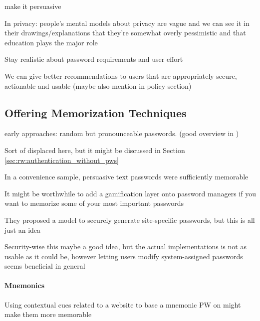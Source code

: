 	
	make it persuasive \cite{Zakaria2013DesigningEffectiveSecurityMessages}
	
	In privacy: people's mental models about privacy are vague and we can see it in their drawings/explanations that they're somewhat overly pessimistic and that education plays the major role \cite{Kang2015MentalModelsDrawing}
	
	
	Stay realistic about password requirements and user effort \cite{Florencio2016CommACM}
	
	We can give better recommendations to users that are appropriately secure, actionable and usable \cite{ZhangKennedy2016RevisitingPasswordRules} (maybe also mention in policy section)
		
	
	\subsection{Offering Memorization Techniques}
	
	
	early approaches: random but pronounceable passwords. (good overview in \cite{Kuo2006HumanSelectionMnemonic})
	
	\cite{Bonneau2014ReliableStorage56Bits}
	\cite{Forget2007HelpingUsers}
	Sort of displaced here, but it might be discussed in Section \ref{sec:rw:authentication_without_pws} \cite{Forget2015CYOA}
	\cite{Brown2004GeneratingPWs}
	
	In a convenience sample, persuasive text passwords were sufficiently memorable \cite{Forget2008MemorabilityPersuasivePasswords}
	
	It might be worthwhile to add a gamification layer onto password managers if you want to memorize some of your most important passwords \cite{Kroeze2012GamifyingAuthentication}
	
	They proposed a model to securely generate site-specific passwords, but this is all just an idea \cite{Maqbali2016PasswordGenerators}
	
	
	Security-wise this maybe a good idea, but the actual implementations is not as usable as it could be, however letting users modify system-assigned passwords seems beneficial in general \cite{Huha2015UserReplaceablePasswords}
	
	\paragraph{Mnemonics}
	Using contextual cues related to a website to base a mnemonic PW on might make them more memorable \cite{Mcevoy2016ContextualizingMnemonicPhrase}
	
